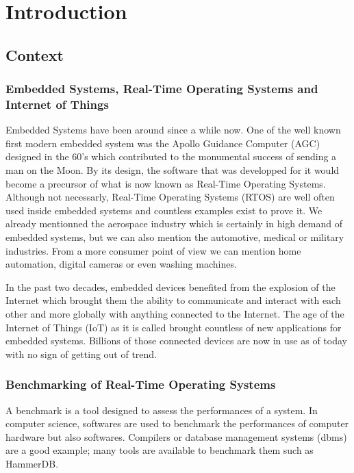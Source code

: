 \chapter*{Introduction}
%
%
\section*{Context}

\subsection*{Embedded Systems, Real-Time Operating Systems and Internet of Things}

Embedded Systems have been around since a while now.
One of the well known first modern embedded system was the Apollo Guidance Computer (AGC) designed in the 60's
    which contributed to the monumental success of sending a man on the Moon.
By its design, the software that was developped for it would become a precursor of what is now known as Real-Time Operating Systems.
Although not necessarly, Real-Time Operating Systems (RTOS) are well often used inside embedded systems and countless examples exist to prove it.
We already mentionned the aerospace industry which is certainly in high demand of embedded systems, 
    but we can also mention the automotive, medical or military industries.
From a more consumer point of view we can mention home automation, digital cameras or even washing machines.

In the past two decades, embedded devices benefited from the explosion of the Internet which brought them 
    the ability to communicate and interact with each other and more globally with anything connected to the Internet.
The age of the Internet of Things (IoT) as it is called brought countless of new applications for embedded systems.
Billions of those connected devices are now in use as of today with no sign of getting out of trend.

\subsection*{Benchmarking of Real-Time Operating Systems}

A benchmark is a tool designed to assess the performances of a system.
In computer science, softwares are used to benchmark the performances of computer hardware but also softwares.
Compilers or database management systems (dbms) are a good example; many tools are available to benchmark them such as HammerDB.


